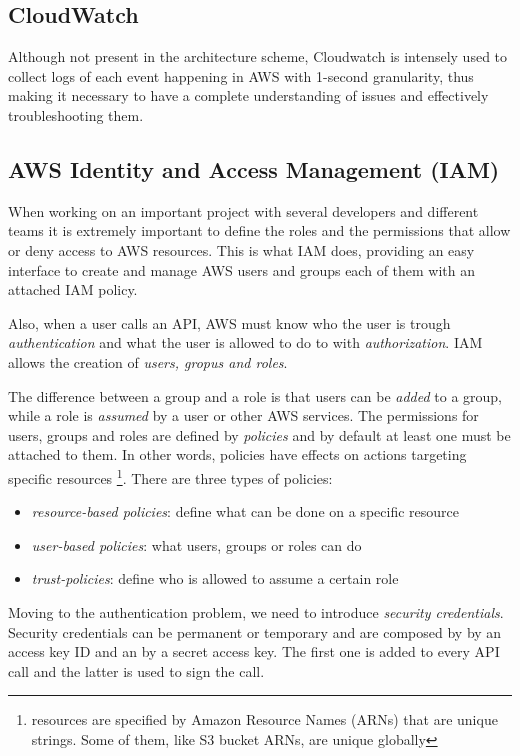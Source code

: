\subsection{CloudWatch}
\label{sec:elast_service}
Although not present in the architecture scheme, Cloudwatch is intensely used 
to collect logs of each event happening in AWS  with 1-second granularity, thus making it necessary
to have a complete understanding of issues and effectively troubleshooting them.

\subsection{AWS Identity and Access Management (IAM) }
\label{sec:IAM}
When working on an important project with several developers and different teams
it is extremely important to define the roles and the permissions that allow or deny access to AWS resources.
This is what IAM does, providing an easy interface to create and manage AWS users and groups
each of them with an attached IAM policy.

Also, when a user calls an API, AWS must know who the user is trough
\textit{authentication} and what the user is allowed to do to with
\textit{authorization}.  IAM allows the creation of \textit{users,
  gropus and roles}.

The difference between a group and a role is that users can be \textit{added} to a group,
while a role is \textit{assumed} by a user or other AWS services.
The permissions for users, groups and roles are defined by \textit{policies}  and by default at 
least one must be attached to them. In other words,  policies have effects on actions targeting specific resources
\footnote{resources are specified by Amazon Resource Names (ARNs) that are unique strings. Some of them, like
S3 bucket ARNs, are unique globally}.
There are three types of policies: 
\begin{itemize}
  \item \textit{resource-based policies}: define what can be done on a specific resource
  \item \textit{user-based policies}: what users, groups or roles can do
  \item \textit{trust-policies}: define who is allowed to assume a certain role
\end{itemize}

Moving to the authentication problem, we need to introduce \textit{security credentials}.
Security credentials can be permanent or temporary and are composed by by an access key ID and an by a secret access key.
The first one is added to every API call and the latter is used to sign the call.

